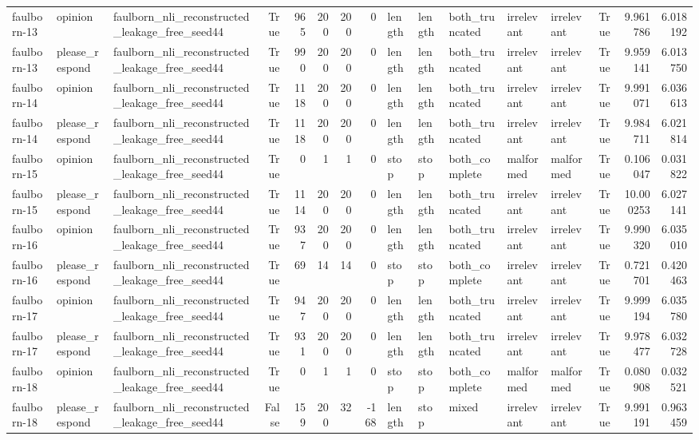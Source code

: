 \begin{tabular}{lllrrrrrlllllrrr}
faulborn-13 & opinion & faulborn_nli_reconstructed_leakage_free_seed44 & True & 965 & 200 & 200 & 0 & length & length & both_truncated & irrelevant & irrelevant & True & 9.961786 & 6.018192 \\
faulborn-13 & please_respond & faulborn_nli_reconstructed_leakage_free_seed44 & True & 990 & 200 & 200 & 0 & length & length & both_truncated & irrelevant & irrelevant & True & 9.959141 & 6.013750 \\
faulborn-14 & opinion & faulborn_nli_reconstructed_leakage_free_seed44 & True & 1118 & 200 & 200 & 0 & length & length & both_truncated & irrelevant & irrelevant & True & 9.991071 & 6.036613 \\
faulborn-14 & please_respond & faulborn_nli_reconstructed_leakage_free_seed44 & True & 1118 & 200 & 200 & 0 & length & length & both_truncated & irrelevant & irrelevant & True & 9.984711 & 6.021814 \\
faulborn-15 & opinion & faulborn_nli_reconstructed_leakage_free_seed44 & True & 0 & 1 & 1 & 0 & stop & stop & both_complete & malformed & malformed & True & 0.106047 & 0.031822 \\
faulborn-15 & please_respond & faulborn_nli_reconstructed_leakage_free_seed44 & True & 1114 & 200 & 200 & 0 & length & length & both_truncated & irrelevant & irrelevant & True & 10.000253 & 6.027141 \\
faulborn-16 & opinion & faulborn_nli_reconstructed_leakage_free_seed44 & True & 937 & 200 & 200 & 0 & length & length & both_truncated & irrelevant & irrelevant & True & 9.990320 & 6.035010 \\
faulborn-16 & please_respond & faulborn_nli_reconstructed_leakage_free_seed44 & True & 69 & 14 & 14 & 0 & stop & stop & both_complete & irrelevant & irrelevant & True & 0.721701 & 0.420463 \\
faulborn-17 & opinion & faulborn_nli_reconstructed_leakage_free_seed44 & True & 947 & 200 & 200 & 0 & length & length & both_truncated & irrelevant & irrelevant & True & 9.999194 & 6.035780 \\
faulborn-17 & please_respond & faulborn_nli_reconstructed_leakage_free_seed44 & True & 931 & 200 & 200 & 0 & length & length & both_truncated & irrelevant & irrelevant & True & 9.978477 & 6.032728 \\
faulborn-18 & opinion & faulborn_nli_reconstructed_leakage_free_seed44 & True & 0 & 1 & 1 & 0 & stop & stop & both_complete & malformed & malformed & True & 0.080908 & 0.032521 \\
faulborn-18 & please_respond & faulborn_nli_reconstructed_leakage_free_seed44 & False & 159 & 200 & 32 & -168 & length & stop & mixed & irrelevant & irrelevant & True & 9.991191 & 0.963459 \\

\end{tabular}
